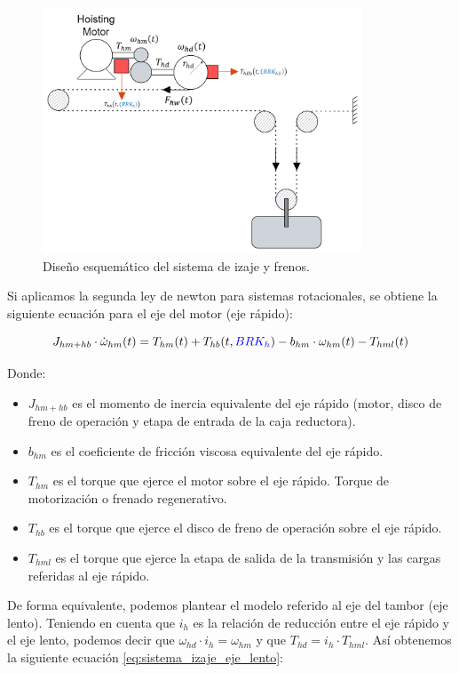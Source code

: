 \documentclass[11pt]{article}
\begin{document}
\begin{figure}[h!]
	\centering
	\includegraphics[width=0.85\textwidth]{images/imagen_5_sistema_izaje.png}
	\caption{Diseño esquemático del sistema de izaje y frenos.}
	\label{fig:sistema_izaje}
\end{figure}

Si aplicamos la segunda ley de newton para sistemas rotacionales, se obtiene la siguiente ecuación para el eje del motor (eje rápido):

\begin{equation}
	\label{eq:sistema_izaje_eje_rapido}
	J_{hm+hb}\cdot\dot{\omega}_{hm}(t)=T_{hm}(t)+T_{hb}(t,{\color{blue}BRK_{h}})-b_{hm}\cdot\omega_{hm}(t)-T_{hml}(t)
\end{equation}

Donde:

\begin{itemize}
	\item $J_{hm+hb}$ es el momento de inercia equivalente del eje rápido (motor, disco de freno de operación y etapa de entrada de la caja reductora).
	\item $b_{hm}$ es el coeficiente de fricción viscosa equivalente del eje rápido.
	\item $T_{hm}$ es el torque que ejerce el motor sobre el eje rápido. Torque de motorización o frenado regenerativo.
	\item $T_{hb}$ es el torque que ejerce el disco de freno de operación sobre el eje rápido.
	\item $T_{hml}$ es el torque que ejerce la etapa de salida de la transmisión y las cargas referidas al eje rápido.
\end{itemize}

De forma equivalente, podemos plantear el modelo referido al eje del tambor (eje lento). Teniendo en cuenta que $i_{h}$ es la relación de reducción entre el eje rápido y el eje lento, podemos decir que $\omega_{hd}\cdot i_{h}=\omega_{hm}$ y que $T_{hd}=i_{h}\cdot T_{hml}$.
Así obtenemos la siguiente ecuación \ref{eq:sistema_izaje_eje_lento}:
\end{document}
